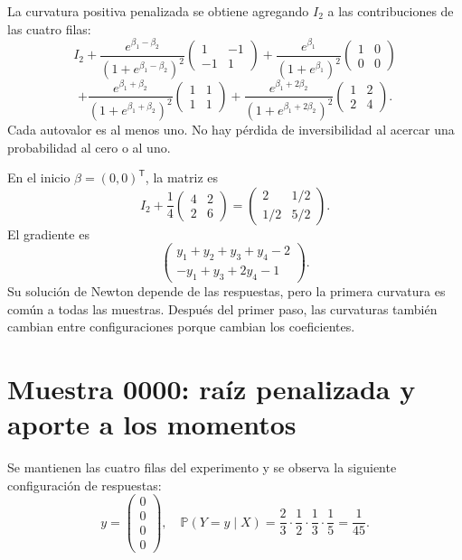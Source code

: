 \documentclass[11pt,a4paper]{article}
\newcommand{\Prob}{\mathbb P}
\newcommand{\T}{^{\mathsf T}}
\begin{document}
La curvatura positiva penalizada se obtiene agregando
\(I_2\) a las contribuciones de las cuatro filas:
\[
I_2+
\frac{e^{\beta_1-\beta_2}}{(1+e^{\beta_1-\beta_2})^2}
\begin{pmatrix}1&-1\\-1&1\end{pmatrix}
+\frac{e^{\beta_1}}{(1+e^{\beta_1})^2}
\begin{pmatrix}1&0\\0&0\end{pmatrix}
\]
\[
+\frac{e^{\beta_1+\beta_2}}{(1+e^{\beta_1+\beta_2})^2}
\begin{pmatrix}1&1\\1&1\end{pmatrix}
+\frac{e^{\beta_1+2\beta_2}}{(1+e^{\beta_1+2\beta_2})^2}
\begin{pmatrix}1&2\\2&4\end{pmatrix}.
\]
Cada autovalor es al menos uno.
No hay pérdida de inversibilidad al acercar
una probabilidad al cero o al uno.

En el inicio \(\beta=(0,0)\T\), la matriz es
\[
I_2+\frac14\begin{pmatrix}4&2\\2&6\end{pmatrix}
=\begin{pmatrix}2&1/2\\1/2&5/2\end{pmatrix}.
\]
El gradiente es
\[
\begin{pmatrix}
y_1+y_2+y_3+y_4-2\\-y_1+y_3+2y_4-1
\end{pmatrix}.
\]
Su solución de Newton depende de las respuestas,
pero la primera curvatura es común a todas las muestras.
Después del primer paso, las curvaturas también cambian
entre configuraciones porque cambian los coeficientes.

\clearpage
\section{Muestra 0000: raíz penalizada y aporte a los momentos}\label{logit125}
\begingroup\small
\setlength{\abovedisplayskip}{4pt}\setlength{\belowdisplayskip}{4pt}
Se mantienen las cuatro filas del experimento y se observa
la siguiente configuración de respuestas:
\[
y=\begin{pmatrix}0\\0\\0\\0\end{pmatrix},\quad \Prob(Y=y\mid X)=\frac{2}{3}\cdot\frac{1}{2}\cdot\frac{1}{3}\cdot\frac{1}{5}=\frac{1}{45}.
\]
\end{document}
